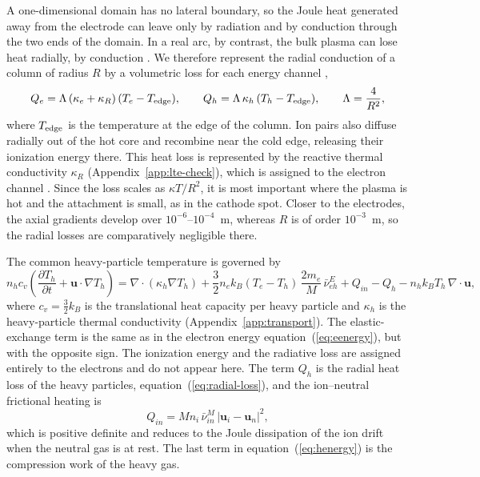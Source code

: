 A one-dimensional domain has no lateral boundary, so the Joule heat generated away from the electrode can leave only by radiation and by conduction through the two ends of the domain. In a real arc, by contrast, the bulk plasma can lose heat radially, by conduction \cite{elenbaas1935ahnlichkeitsgesetze}. We therefore represent the radial conduction of a column of radius \(R\) by a volumetric loss for each energy channel \cite{elenbaas1935ahnlichkeitsgesetze},
\begin{equation}
Q_e=\Lambda\,(\kappa_e+\kappa_R)\,(T_e-T_{\rm edge}),
\qquad
Q_h=\Lambda\,\kappa_h\,(T_h-T_{\rm edge}),
\qquad
\Lambda=\frac{4}{R^2},
\label{eq:radial-loss}
\end{equation}
where \(T_{\rm edge}\) is the temperature at the edge of the column. Ion pairs also diffuse radially out of the hot core and recombine near the cold edge, releasing their ionization energy there. This heat loss is represented by the reactive thermal conductivity \(\kappa_R\) (Appendix~\ref{app:lte-check}), which is assigned to the electron channel \cite{Freton2012}.  Since the loss scales as \(\kappa T/R^2\), it is most important where the plasma is hot and the attachment is small, as in the cathode spot.  Closer to the electrodes, the axial gradients develop over \(10^{-6}\)--\(10^{-4}\)~m, whereas \(R\) is of order \(10^{-3}\)~m, so the radial losses are comparatively negligible there.

The common heavy-particle temperature is governed by
\begin{equation}
n_hc_v\left(\frac{\partial T_h}{\partial t}+\mathbf{u}\cdot\nabla T_h\right)
=\nabla\cdot(\kappa_h\nabla T_h)
+\frac32n_ek_B(T_e-T_h)\,\frac{2m_e}{M}\,\bar\nu^E_{eh}
+Q_{in}
-Q_h
-n_hk_BT_h\,\nabla\cdot\mathbf{u},
\label{eq:henergy}
\end{equation}
where \(c_v=\tfrac32k_B\) is the translational heat capacity per heavy particle and \(\kappa_h\) is the heavy-particle thermal conductivity (Appendix~\ref{app:transport}). The elastic-exchange term is the same as in the electron energy equation~(\ref{eq:eenergy}), but with the opposite sign. The ionization energy and the radiative loss are assigned entirely to the electrons and do not appear here. The term \(Q_h\) is the radial heat loss of the heavy particles, equation~(\ref{eq:radial-loss}), and the ion--neutral frictional heating is
\begin{equation}
Q_{in}=Mn_i\,\bar\nu^M_{in}\,|\mathbf{u}_i-\mathbf{u}_n|^2 ,
\label{eq:Qin}
\end{equation}
which is positive definite and reduces to the Joule dissipation of the ion drift when the neutral gas is at rest. The last term in equation~(\ref{eq:henergy}) is the compression work of the heavy gas.

